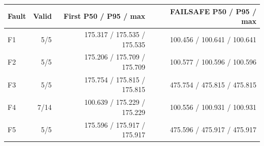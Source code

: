 \begin{tabular}{@{}lrrr@{}}\toprule Fault & Valid & First P50 / P95 / max & FAILSAFE P50 / P95 / max\\\midrule
F1 & 5/5 & 175.317 / 175.535 / 175.535 & 100.456 / 100.641 / 100.641\\[5pt]
F2 & 5/5 & 175.206 / 175.709 / 175.709 & 100.577 / 100.596 / 100.596\\[5pt]
F3 & 5/5 & 175.754 / 175.815 / 175.815 & 475.754 / 475.815 / 475.815\\[5pt]
F4 & 7/14 & 100.639 / 175.229 / 175.229 & 100.556 / 100.931 / 100.931\\[5pt]
F5 & 5/5 & 175.596 / 175.917 / 175.917 & 475.596 / 475.917 / 475.917\\[5pt]
\bottomrule\end{tabular}
